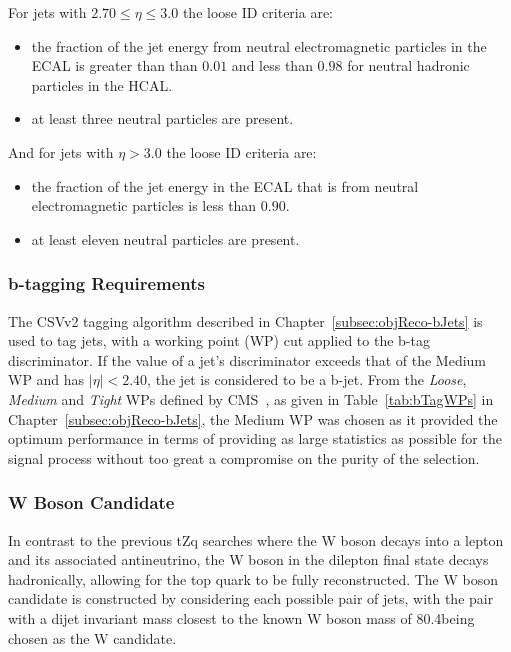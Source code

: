 For jets with $ 2.70 \leq \eta \leq 3.0$ the loose ID criteria are:
\begin{itemize}
\item the fraction of the jet energy from neutral electromagnetic particles in the ECAL is greater than than $0.01$ and less than $0.98$ for neutral hadronic particles in the HCAL.
\item at least three neutral particles are present.
\end{itemize}

And for jets with $\eta > 3.0$ the loose ID criteria are:
\begin{itemize}
\item the fraction of the jet energy in the ECAL that is from neutral electromagnetic particles is less than $0.90$.
\item at least eleven neutral particles are present.
\end{itemize}

\subsubsection{b-tagging Requirements}
The CSVv2 tagging algorithm described in Chapter~\ref{subsec:objReco-bJets} is used to tag jets, with a working point (WP) cut applied to the b-tag discriminator.
If the value of a jet's discriminator exceeds that of the Medium WP and has $|\eta| < 2.40$, the jet is considered to be a b-jet.
From the \emph{Loose}, \emph{Medium} and \emph{Tight} WPs defined by CMS~\cite{Sirunyan:2017ezt}, as given in Table~\ref{tab:bTagWPs} in Chapter~\ref{subsec:objReco-bJets}, the Medium WP was chosen as it provided the optimum performance in terms of providing as large statistics as possible for the signal process without too great a compromise on the purity of the selection.

\subsubsection{W Boson Candidate}
In contrast to the previous tZq searches where the W boson decays into a lepton and its associated antineutrino, the W boson in the dilepton final state decays hadronically, allowing for the top quark to be fully reconstructed.
The W boson candidate is constructed by considering each possible pair of jets, with the pair with a dijet invariant mass closest to the known W boson mass of 80.4\GeVcc being chosen as the W candidate.

